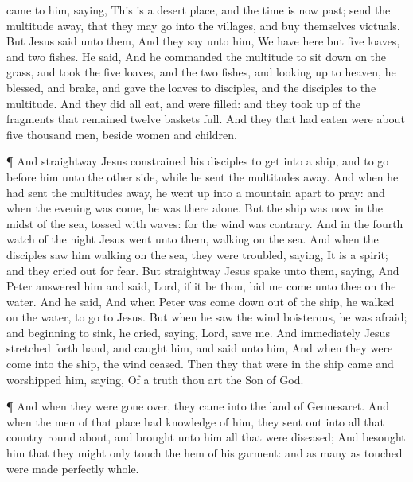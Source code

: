 {came to
him,
saying, This
is a
desert
place,
and the
time
is
now
past;
send the
multitude
away,
that they
may
go
into the
villages, and
buy
themselves
victuals.
But
Jesus
said unto
them,
{}
And they
say unto
him, We
have
here
but
five
loaves,
and
two
fishes.
He
said,
{}
And he
commanded the
multitude to sit
down
on the
grass,
and
took
the
five
loaves,
and
the
two
fishes, and looking
up
to
heaven, he
blessed,
and
brake, and
gave the
loaves
to
{}
disciples,
and the
disciples to the
multitude.
And they
did
all
eat,
and were
filled:
and they took
up of the
fragments that
remained
twelve
baskets
full.
And they that had
eaten
were
about five
thousand
men,
beside
women
and
children.
\par }{\PP {}¶
And
straightway
Jesus
constrained
his
disciples to
get
into a
ship,
and to go
before
him
unto the other
side,
while he
sent the
multitudes
away.
And when he had
sent the
multitudes
away, he went
up
into a
mountain
apart to
pray: and
when the
evening was
come, he
was
there
alone.
But the
ship
was
now in the
midst of the
sea,
tossed
with
waves:
for the
wind
was
contrary.
And in the
fourth
watch of the
night
Jesus
went
unto
them,
walking
on the
sea.
And
when the
disciples
saw
him
walking
on the
sea, they were
troubled,
saying, It
is a
spirit;
and they cried
out
for
fear.
But
straightway
Jesus
spake unto
them,
saying,
{}
And
Peter
answered
him and
said,
Lord,
if it
be
thou,
bid
me
come
unto
thee
on the
water.
And he
said,
{} And
when
Peter was come
down
out of the
ship, he
walked
on the
water, to
go
to
Jesus.
But when he
saw the
wind
boisterous, he was
afraid;
and
beginning to
sink, he
cried,
saying,
Lord,
save
me.
And
immediately
Jesus stretched
forth
{}
hand, and
caught
him,
and
said unto
him,
{}
And when
they were
come
into the
ship, the
wind
ceased.
Then they that
were
in the
ship
came and
worshipped
him,
saying, Of a
truth thou
art the
Son of
God.
\par }{\PP {}¶
And when they were gone
over, they
came
into the
land of
Gennesaret.
And
when the
men of
that
place had knowledge
of
him, they sent
out
into
all
that country round
about,
and
brought unto
him
all that
were
diseased;
And
besought
him
that they
might
only
touch the
hem of
his
garment:
and as many
as
touched were made perfectly
whole.

}
